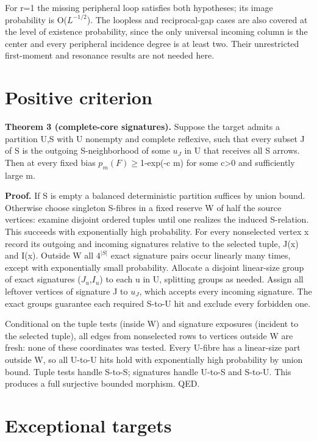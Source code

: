 \documentclass[11pt]{article}
\begin{document}
For r=1 the missing peripheral loop satisfies both hypotheses; its image probability is O($L^{-1/2}$). The loopless and reciprocal-gap cases are also covered at the level of existence probability, since the only universal incoming column is the center and every peripheral incidence degree is at least two. Their unrestricted first-moment and resonance results are not needed here.

\section{Positive criterion}

\textbf{Theorem 3 (complete-core signatures).} Suppose the target admits a partition U,S with U nonempty and complete reflexive, such that every subset J of S is the outgoing S-neighborhood of some $u_{J}$ in U that receives all S arrows. Then at every fixed bias $p_m(F)$\ensuremath{\geq}1-exp(-c m) for some c>0 and sufficiently large m.

\textbf{Proof.} If S is empty a balanced deterministic partition suffices by union bound. Otherwise choose singleton S-fibres in a fixed reserve W of half the source vertices: examine disjoint ordered tuples until one realizes the induced S-relation. This succeeds with exponentially high probability. For every nonselected vertex x record its outgoing and incoming signatures relative to the selected tuple, J(x) and I(x). Outside W all $4^{|S|}$ exact signature pairs occur linearly many times, except with exponentially small probability. Allocate a disjoint linear-size group of exact signatures ($J_{u}$,$I_{u}$) to each u in U, splitting groups as needed. Assign all leftover vertices of signature J to $u_{J}$, which accepts every incoming signature. The exact groups guarantee each required S-to-U hit and exclude every forbidden one.

Conditional on the tuple tests (inside W) and signature exposures (incident to the selected tuple), all edges from nonselected rows to vertices outside W are fresh: none of these coordinates was tested. Every U-fibre has a linear-size part outside W, so all U-to-U hits hold with exponentially high probability by union bound. Tuple tests handle S-to-S; signatures handle U-to-S and S-to-U. This produces a full surjective bounded morphism. QED.

\section{Exceptional targets}
\end{document}
